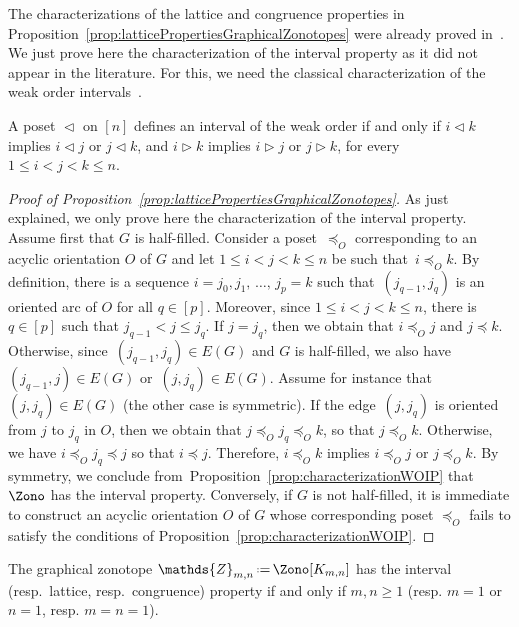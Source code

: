 \documentclass[AHL,Unicode,longabstracts,published]{cedram}
\newcommand{\eqdef}{\mbox{\,\raisebox{0.2ex}{\scriptsize\ensuremath{\mathrm:}}\ensuremath{=}\,}}
\newcommand{\less}{\vartriangleleft}
\newcommand{\more}{\vartriangleright}
\newcommand{\polytope}[1]{\mathds{#1}}
\begin{document}
The characterizations of the lattice and congruence properties in Proposition~\ref{prop:latticePropertiesGraphicalZonotopes} were already proved in~\cite{Pilaud-acyclicReorientationLattices}. We just prove here the characterization of the interval property as it did not appear in the literature. For this, we need the classical characterization of the weak order intervals~\cite{BjornerWachs}.

\begin{prop}\label{prop:characterizationWOIP}
A poset $\less$ on $[n]$ defines an interval of the weak order if and only if $i \less k$ implies $i \less j$ or $j \less k$, and $i \more k$ implies $i \more j$ or $j \more k$, for every~${1 \le i < j < k \le n}$.
\end{prop}

\begin{proof}[Proof of Proposition~\ref{prop:latticePropertiesGraphicalZonotopes}]
As just explained, we only prove here the characterization of the interval property. Assume first that $G$ is half-filled. Consider a poset~$\preccurlyeq_O$ corresponding to an acyclic orientation $O$ of $G$ and let ${1 \le i < j < k \le n}$ be such that~$i \preccurlyeq_O k$. By definition, there is a sequence $i = j_0, j_1,\,\dots,\,j_p = k$ such that~$(j_{q-1}, j_q)$ is an oriented arc of $O$ for all $q \!\in\! [p]$. Moreover, since $1 \!\le\! i \!<\! j \!<\! k \!\le\! n$, there is $q \in [p]$ such that ${j_{q-1} \!<\! j \!\le\! j_q}$. If $j \!=\! j_q$, then we obtain that $i \!\preccurlyeq_O\! j$ and $j \!\preccurlyeq\! k$. Otherwise, since~$(j_{q-1}, j_q) \!\in\! E(G)$ and $G$ is half-filled, we also have $(j_{q-1}, j) \!\in\! E(G)$ or~$(j, j_q) \!\in\! E(G)$. Assume for instance that $(j, j_q) \in E(G)$ (the other case is symmetric). If the edge~$(j, j_q)$ is oriented from $j$ to $j_q$ in $O$, then we obtain that $j \preccurlyeq_O j_q \preccurlyeq_O k$, so that $j \preccurlyeq_O k$. Otherwise, we have $i \preccurlyeq_O j_q \preccurlyeq j$ so that $i \preccurlyeq j$. Therefore, $i \preccurlyeq_O k$ implies $i \preccurlyeq_O j$ or $j \preccurlyeq_O k$. By symmetry, we conclude from~Proposition~\ref{prop:characterizationWOIP} that~$\Zono$ has the interval property. Conversely, if $G$ is not half-filled, it is immediate to construct an acyclic orientation $O$ of $G$ whose corresponding poset $\preccurlyeq_O$ fails to satisfy the conditions of Proposition~\ref{prop:characterizationWOIP}.
\end{proof}

\begin{coro}\label{coro:latticePropertiesBipartiteGraphicalZonotope}
The graphical zonotope $\polytope{Z}_{m,n} \eqdef \Zono[K_{m,n}]$ has the interval (resp.~lattice, resp.~congruence) property if and only if $m,n \ge 1$ (resp. $m = 1$  or~$n = 1$, resp. $m = n = 1$).
\end{coro}
\end{document}
